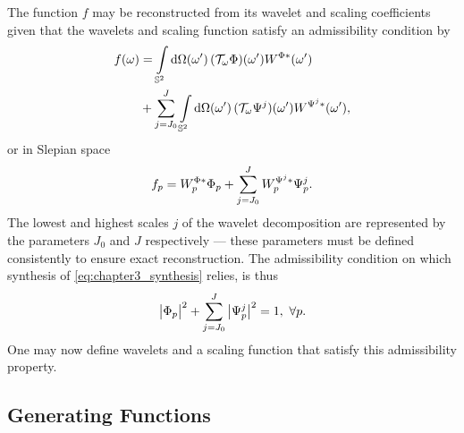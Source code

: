 The function \(f\) may be reconstructed from its wavelet and scaling coefficients given that the wavelets and scaling function satisfy an admissibility condition by
%
\begin{align}\label{eq:chapter3_synthesis}
	\pixel{f}
	 & = \integrateSphere{\omega'} \pixel[']{(\translation{\omega}\Phi)} \pixel[']{W^{\Phi\ast}} \nonumber                         \\
	 & + \waveletSum \integrateSphere{\omega'} \pixel[']{(\translation{\omega}\Psi^{j})} \pixel[']{W^{\Psi^{j}\ast}},
\end{align}
%
or in Slepian space
%
\begin{equation}
	\slepian{f}
	= \slepian{W}^{\Phi\ast} \slepian{\Phi}
	+ \waveletSum \slepian{W}^{\Psi^{j}\ast} \slepian{\Psi}^{j}.
\end{equation}
%
The lowest and highest scales \(j\) of the wavelet decomposition are represented by the parameters \(J_{0}\) and \(J\) respectively --- these parameters must be defined consistently to ensure exact reconstruction.
The admissibility condition on which synthesis of \cref{eq:chapter3_synthesis} relies, is thus
%
\begin{equation}\label{eq:chapter3_admissibility}
	\abs{\slepian{\Phi}}^{2}
	+ \waveletSum \abs{\slepian{\Psi}^{j}}^{2}
	= 1,\ \forall p.
\end{equation}
%
One may now define wavelets and a scaling function that satisfy this admissibility property.

\subsection{Generating Functions}\label{sec:chapter3_generating_functions}

